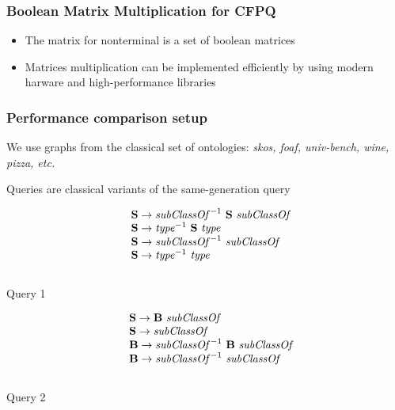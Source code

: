 \documentclass[xcolor=table]{beamer}
\begin{document}
\begin{frame} \frametitle{Boolean Matrix Multiplication for CFPQ}
  \begin{itemize}
    \item The matrix for nonterminal is a set of boolean matrices
    \item Matrices multiplication can be implemented efficiently by using modern harware and high-performance libraries
  \end{itemize}
\end{frame}


\begin{frame}[fragile] \frametitle{Performance comparison setup}
We use graphs from the classical set of ontologies: \textit{skos, foaf, univ-bench, wine, pizza, etc.}
\\
\vspace{2cm}

Queries are classical variants of the same-generation query

\begin{minipage}{0.47\textwidth}
\begin{center}
   \[
\begin{array}{rl}
  &\textbf{S} \rightarrow \text{\textit{subClassOf}}^{-1} \ \textbf{S} \ \text{\textit{subClassOf}} \\
  &\textbf{S} \rightarrow \text{\textit{type}}^{-1} \ \textbf{S} \ \text{\textit{type}} \\
  &\textbf{S} \rightarrow \text{\textit{subClassOf}}^{-1} \ \text{\textit{subClassOf}} \\
  &\textbf{S} \rightarrow \text{\textit{type}}^{-1} \ \text{\textit{type}} \\
\end{array}
\]
\\
   Query 1
   \end{center}
\end{minipage}
\vspace{2cm}
\begin{minipage} {0.47\textwidth}
   \begin{center}
   \[
\begin{array}{rl}
   &\textbf{S} \rightarrow \textbf{B} \ \text{\textit{subClassOf}} \\
   &\textbf{S} \rightarrow \text{\textit{subClassOf}} \\
   &\textbf{B} \rightarrow \text{\textit{subClassOf}}^{-1} \ \textbf{B} \ \text{\textit{subClassOf}} \\
   &\textbf{B} \rightarrow \text{\textit{subClassOf}}^{-1} \ \text{\textit{subClassOf}} \\
\end{array}
\]
\\
   Query 2
\end{center}
\end{minipage}


\end{frame}
\end{document}
